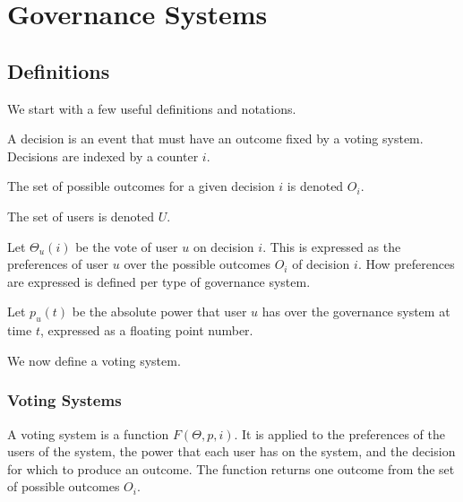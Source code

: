 \chapter{Governance Systems}
\label{sec:theoretical_governance_system}

\section{Definitions}

We start with a few useful definitions and notations.

\begin{definition}[Decision]
  A decision is an event that must have an outcome fixed by a voting system.
  Decisions are indexed by a counter $i$.
\end{definition}

\begin{definition}
  The set of possible outcomes for a given decision $i$ is denoted $O_i$.
\end{definition}

\begin{definition}[Users]
  The set of users is denoted $U$.
\end{definition}

\begin{definition}[Votes]
  Let $\Theta_u(i)$ be the vote of user $u$ on decision $i$.
  This is expressed as the preferences of user $u$ over the possible outcomes $O_i$ of decision $i$.
  How preferences are expressed is defined per type of governance system.
\end{definition}

\begin{definition}[Power]
  Let $p_u(t)$ be the absolute power that user $u$ has over the governance system at time $t$, expressed as a floating point number.
\end{definition}

We now define a voting system.

\subsection{Voting Systems}

\begin{definition}
  \label{def:voting_system}
  A voting system is a function $F(\Theta, p, i)$.
  It is applied to the preferences of the users of the system, the power that each user has on the system, and the decision for which to produce an outcome.
  The function returns one outcome from the set of possible outcomes $O_i$.
\end{definition}

